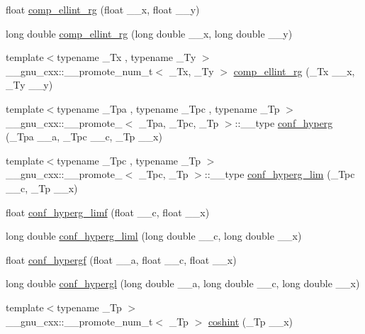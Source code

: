 \begin{DoxyCompactItemize}
\item 
float \hyperlink{namespace____gnu__cxx_a978f8eec6e5edc918b243925dbacb65b}{comp\+\_\+ellint\+\_\+rg} (float \+\_\+\+\_\+x, float \+\_\+\+\_\+y)
\item 
long double \hyperlink{namespace____gnu__cxx_aca5fa8ee8125afc8f35ec6b27806e873}{comp\+\_\+ellint\+\_\+rg} (long double \+\_\+\+\_\+x, long double \+\_\+\+\_\+y)
\item 
{\footnotesize template$<$typename \+\_\+\+Tx , typename \+\_\+\+Ty $>$ }\\\+\_\+\+\_\+gnu\+\_\+cxx\+::\+\_\+\+\_\+promote\+\_\+num\+\_\+t$<$ \+\_\+\+Tx, \+\_\+\+Ty $>$ \hyperlink{namespace____gnu__cxx_a2c65744cf12dc54d7176258f791a87da}{comp\+\_\+ellint\+\_\+rg} (\+\_\+\+Tx \+\_\+\+\_\+x, \+\_\+\+Ty \+\_\+\+\_\+y)
\item 
{\footnotesize template$<$typename \+\_\+\+Tpa , typename \+\_\+\+Tpc , typename \+\_\+\+Tp $>$ }\\\+\_\+\+\_\+gnu\+\_\+cxx\+::\+\_\+\+\_\+promote\+\_$<$ \+\_\+\+Tpa, \+\_\+\+Tpc, \+\_\+\+Tp $>$\+::\+\_\+\+\_\+type \hyperlink{namespace____gnu__cxx_a2e17ccbbc4cbb99c987e875531d4a3de}{conf\+\_\+hyperg} (\+\_\+\+Tpa \+\_\+\+\_\+a, \+\_\+\+Tpc \+\_\+\+\_\+c, \+\_\+\+Tp \+\_\+\+\_\+x)
\item 
{\footnotesize template$<$typename \+\_\+\+Tpc , typename \+\_\+\+Tp $>$ }\\\+\_\+\+\_\+gnu\+\_\+cxx\+::\+\_\+\+\_\+promote\+\_$<$ \+\_\+\+Tpc, \+\_\+\+Tp $>$\+::\+\_\+\+\_\+type \hyperlink{namespace____gnu__cxx_ab923b5a9e67469a5145d7bfcb20b3396}{conf\+\_\+hyperg\+\_\+lim} (\+\_\+\+Tpc \+\_\+\+\_\+c, \+\_\+\+Tp \+\_\+\+\_\+x)
\item 
float \hyperlink{namespace____gnu__cxx_a609879a370bc4e9fc70563806bc49cb9}{conf\+\_\+hyperg\+\_\+limf} (float \+\_\+\+\_\+c, float \+\_\+\+\_\+x)
\item 
long double \hyperlink{namespace____gnu__cxx_a367be9b77eb1f9ccc2971d5300da48d1}{conf\+\_\+hyperg\+\_\+liml} (long double \+\_\+\+\_\+c, long double \+\_\+\+\_\+x)
\item 
float \hyperlink{namespace____gnu__cxx_abd18e600aa78c3f2b2f835039506c810}{conf\+\_\+hypergf} (float \+\_\+\+\_\+a, float \+\_\+\+\_\+c, float \+\_\+\+\_\+x)
\item 
long double \hyperlink{namespace____gnu__cxx_a0a9853f30d8fa515a12cd45a92da832e}{conf\+\_\+hypergl} (long double \+\_\+\+\_\+a, long double \+\_\+\+\_\+c, long double \+\_\+\+\_\+x)
\item 
{\footnotesize template$<$typename \+\_\+\+Tp $>$ }\\\+\_\+\+\_\+gnu\+\_\+cxx\+::\+\_\+\+\_\+promote\+\_\+num\+\_\+t$<$ \+\_\+\+Tp $>$ \hyperlink{namespace____gnu__cxx_aceef7e29a05055fa1e1300301f51f139}{coshint} (\+\_\+\+Tp \+\_\+\+\_\+x)

\end{DoxyCompactItemize}
